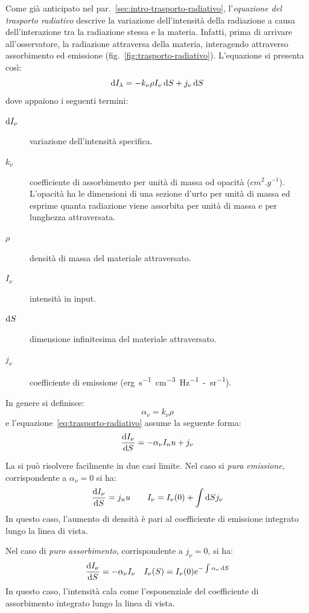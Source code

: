 Come già anticipato nel par.~\ref{sec:intro-trasporto-radiativo}, l'\emph{equazione del trasporto radiativo} descrive la variazione dell'intensità della radiazione a causa dell'interazione tra la radiazione stessa e la materia. Infatti, prima di arrivare all'osservatore, la radiazione attraversa della materia, interagendo attraverso assorbimento ed emissione (fig.~\ref{fig:trasporto-radiativo}). L'equazione si presenta così:
\begin{equation}\label{eq:trasporto-radiativo}
    \mathop{\mathrm{{}d}}\mathopen{} I_\lambda = - k_\nu \rho I_\nu \mathop{\mathrm{{}d}}\mathopen{} S + j_\nu \mathop{\mathrm{{}d}}\mathopen{} S
\end{equation}
dove appaiono i seguenti termini:
\begin{description}
    \item[$\mathop{\mathrm{{}d}}\mathopen{} I_\nu$] variazione dell'intensità specifica.
    \item[$k_\nu$] coefficiente di assorbimento per unità di massa od opacità ($\si{cm^2.g^{-1}}$). L'opacità ha le dimensioni di una sezione d'urto per unità di massa ed esprime quanta radiazione viene assorbita per unità di massa e per lunghezza attraversata.
    \item[$\rho$] densità di massa del materiale attraversato.
    \item[$I_\nu$] intensità in input.
    \item[$\mathop{\mathrm{{}d}}\mathopen{} S$] dimensione infinitesima del materiale attraversato.
    \item[$j_\nu$] coefficiente di emissione (\si{erg.s^{-1}.cm^{-3}.Hz^{-1}-sr^{-1}}).
\end{description}

In genere si definisce:
\[
\alpha_\nu = k_\nu \rho
\]
e l'equazione~\eqref{eq:trasporto-radiativo} assume la seguente forma:
\begin{equation}\label{eq:trasporto-radiativo2}
    \frac{\mathop{\mathrm{{}d}}\mathopen{} I_\nu}{\mathop{\mathrm{{}d}}\mathopen{} S} = -\alpha_\nu I_nu + j_\nu
\end{equation}

La si può risolvere facilmente in due casi limite. Nel caso si \emph{pura emissione}, corrispondente a $\alpha_\nu = 0$ si ha:
\[
    \frac{\mathop{\mathrm{{}d}}\mathopen{} I_\nu}{\mathop{\mathrm{{}d}}\mathopen{} S} = j_nu \qquad I_\nu = I_\nu (0) + \int \mathop{\mathrm{{}d}}\mathopen{} S j_\nu
\]
In questo caso, l'aumento di densità è pari al coefficiente di emissione integrato lungo la linea di vista.

Nel caso di \emph{puro assorbimento}, corrispondente a $j_\nu = 0$, si ha:
\[
\frac{\mathop{\mathrm{{}d}}\mathopen{} I_\nu}{\mathop{\mathrm{{}d}}\mathopen{} S} = -\alpha_\nu I_\nu \quad 
I_\nu (S) = I_\nu (0) e^{-\int \alpha_\nu \mathop{\mathrm{{}d}}\mathopen{} S}
\]
In questo caso, l'intensità cala come l'esponenziale del coefficiente di assorbimento integrato lungo la linea di vista.

